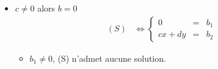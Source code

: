 \documentclass{article}
\begin{document}
\begin{question_kholle}
\begin{itemize}[label=$\bullet$ Supposons]
\begin{itemize}[label=$\bullet$ Si]
\begin{itemize}[label=$\bullet$ Si]
\begin{itemize}[label=$\bullet$ Si]
                          \end{itemize}
                    \item $b \neq 0$
                          \begin{equation*}
                            (S) \iff
                            \left\{ \begin{array}{ccc}
                              y & = & \frac{b_1}{b}        \\
                              0 & = & b_2 - \frac{db_1}{b}
                            \end{array} \right.
                          \end{equation*}
                          \begin{itemize}[label=$\bullet$ Si]
                            \item $b_2 - \frac{db_1}{b} \neq 0$, (S) n'admet aucune solution.
                            \item $b_2 - \frac{db_1}{b} = 0$, $(S) \iff y = \frac{b_1}{b} \iff \begin{pmatrix} x \\ y \end{pmatrix} \in \begin{Bmatrix} \begin{pmatrix} t \\ \frac{b_1}{d} \end{pmatrix} |\; t \in \K \end{Bmatrix}$ donc (S) admet une droite affine de solutions.
                          \end{itemize}
                  \end{itemize}
            \item $c \neq 0$ alors $b = 0$
                  \begin{equation*}
                    \begin{aligned}
                      (S)
                       & \iff \left\{ \begin{array}{ccc}
                                        0       & = & b_1 \\
                                        cx + dy & = & b_2
                                      \end{array} \right.
                    \end{aligned}
                  \end{equation*}
                  \begin{itemize}[label=$\bullet$ Si]
                    \item $b_1 \neq 0$, (S) n'admet aucune solution.

\end{itemize}
\end{itemize}
\end{itemize}
\end{question_kholle}
\end{document}
